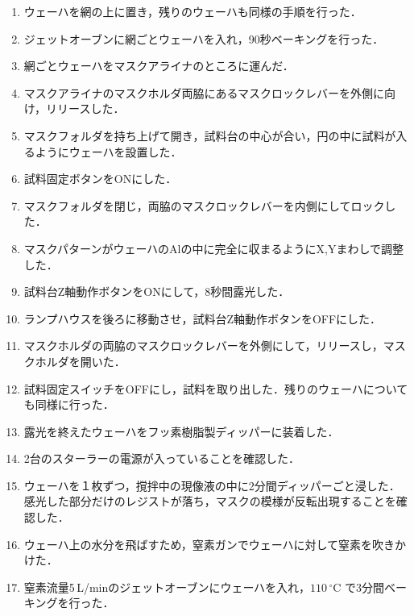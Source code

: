 \documentclass[11pt]{jarticle}
\begin{document}
\begin{enumerate}
\begin{enumerate}
					\item ウェーハを網の上に置き，残りのウェーハも同様の手順を行った．
					\item ジェットオーブンに網ごとウェーハを入れ，90秒ベーキングを行った．
					\item 網ごとウェーハをマスクアライナのところに運んだ．
					\item マスクアライナのマスクホルダ両脇にあるマスクロックレバーを外側に向け，リリースした．
					\item マスクフォルダを持ち上げて開き，試料台の中心が合い，円の中に試料が入るようにウェーハを設置した．
					\item 試料固定ボタンをONにした．
					\item マスクフォルダを閉じ，両脇のマスクロックレバーを内側にしてロックした．
					\item マスクパターンがウェーハのAlの中に完全に収まるようにX,Yまわしで調整した．
					\item 試料台Z軸動作ボタンをONにして，8秒間露光した．
					\item ランプハウスを後ろに移動させ，試料台Z軸動作ボタンをOFFにした．
					\item マスクホルダの両脇のマスクロックレバーを外側にして，リリースし，マスクホルダを開いた．
					\item 試料固定スイッチをOFFにし，試料を取り出した．残りのウェーハについても同様に行った．
					\item 露光を終えたウェーハをフッ素樹脂製ディッパーに装着した．
					\item 2台のスターラーの電源が入っていることを確認した．
					\item ウェーハを１枚ずつ，撹拌中の現像液の中に2分間ディッパーごと浸した．感光した部分だけのレジストが落ち，マスクの模様が反転出現することを確認した．
					\item ウェーハ上の水分を飛ばすため，窒素ガンでウェーハに対して窒素を吹きかけた．
					\item 窒素流量5\,L/minのジェットオーブンにウェーハを入れ，$110\,^\circ \mathrm{C}$ で3分間ベーキングを行った．
				\end{enumerate}


\end{enumerate}
\end{document}
